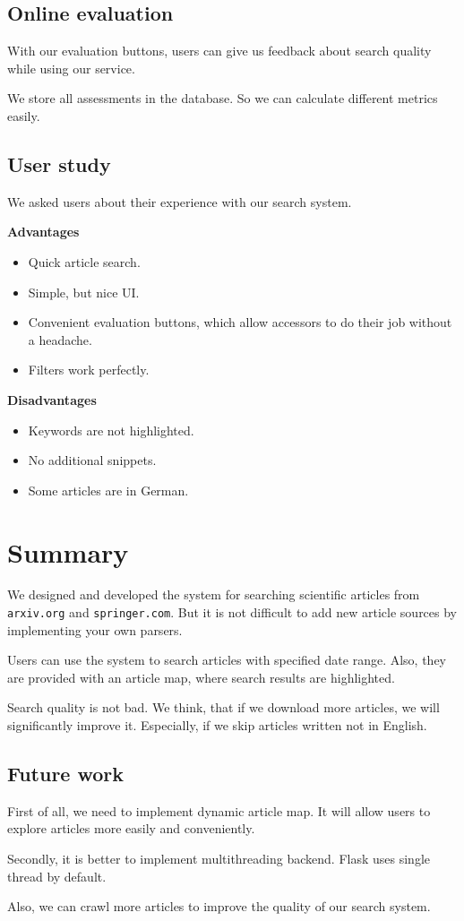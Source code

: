 \subsection{Online evaluation}
With our evaluation buttons, users can give us feedback about search quality while using our service.

We store all assessments in the database. So we can calculate different metrics easily.

\subsection{User study}
We asked users about their experience with our search system.

\textbf{Advantages}
\begin{itemize}
	\item Quick article search.
	\item Simple, but nice UI.
	\item Convenient evaluation buttons, which allow accessors to do their job without a headache.
	\item Filters work perfectly.
\end{itemize}

\textbf{Disadvantages}
\begin{itemize}
	\item Keywords are not highlighted.
	\item No additional snippets.
	\item Some articles are in German.
\end{itemize}	
 
\section{Summary}
We designed and developed the system for searching scientific articles from \texttt{arxiv.org} and \texttt{springer.com}. But it is not difficult to add new article sources by implementing your own parsers.

Users can use the system to search articles with specified date range. Also, they are provided with an article map, where search results are highlighted.

Search quality is not bad. We think, that if we download more articles, we will significantly improve it. Especially, if we skip articles written not in English.

\subsection{Future work}
First of all, we need to implement dynamic article map. It will allow users to explore articles more easily and conveniently.

Secondly, it is better to implement multithreading backend. Flask uses single thread by default. 

Also, we can crawl more articles to improve the quality of our search system.

